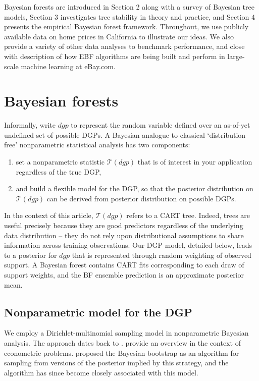 \documentclass{article}
\begin{document}
Bayesian forests are introduced in Section 2 along with a survey
of  Bayesian tree models, Section 3  investigates tree stability in
theory and practice, and Section 4 presents the empirical Bayesian forest
framework. Throughout, we use publicly available data on home prices in
California to illustrate our ideas. We also provide a variety of other data
analyses to benchmark performance, and close with description of how EBF
algorithms are being built and perform in large-scale machine learning at
eBay.com.



\section{Bayesian forests}\label{bayesian-forests}

Informally, write $dgp$ to represent the random variable defined over an as-of-yet undefined set of possible DGPs.
A Bayesian analogue to classical `distribution-free' nonparametric
statistical analysis \citep[e.g.,][]{hollander_nonparametric_1999} has two components:
\begin{enumerate}
\item set a nonparametric statistic $\mathcal{T}(dgp)$ that is of interest in your application regardless of the true DGP,
\item and build a flexible model for the DGP, so that the posterior distribution on $\mathcal{T}(dgp)$ can be derived from  posterior distribution on possible DGPs.
\end{enumerate}
In  the context of this article, $\mathcal{T}(dgp)$ refers to a CART tree.   Indeed, trees are useful precisely because they are good predictors regardless of the underlying data distribution -- they do not rely upon distributional assumptions to share information across training observations. 
Our DGP model, detailed below, leads to a posterior for $dgp$ that is represented through random weighting of observed support.  A Bayesian forest contains CART fits corresponding to each draw of support weights, and the BF ensemble prediction is an approximate posterior mean.

\subsection{Nonparametric model for the DGP}\label{dgpmodel}

We employ a Dirichlet-multinomial sampling model in nonparametric
Bayesian analysis. The approach dates back to
\citet{ferguson_bayesian_1973}. \citet{chamberlain_nonparametric_2003}
provide an overview in the context of econometric problems.
\citet{rubin_bayesian_1981} proposed the Bayesian bootstrap as an
algorithm for sampling from versions of the posterior implied by this
strategy, and the algorithm has since become closely associated with
this model.
\end{document}
